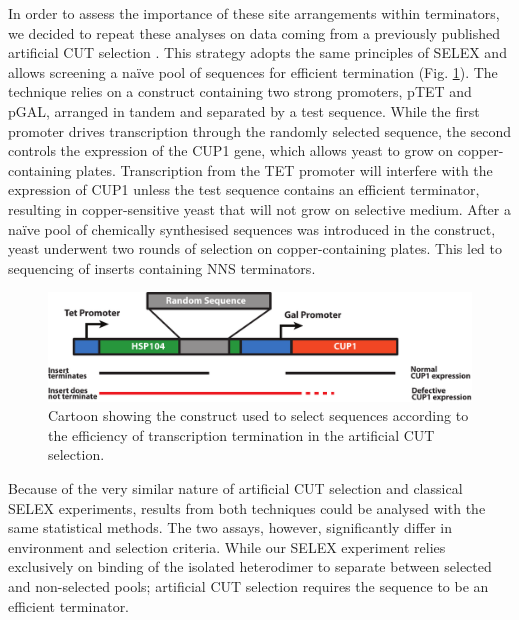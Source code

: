 In order to assess the importance of these site arrangements within \invivo{} terminators, we decided to repeat these analyses on data coming from a previously published \invivo{} artificial CUT selection \cite{porrua:2012:in}. This strategy adopts the same principles of SELEX and allows screening a naïve pool of sequences for efficient termination \invivo{} (Fig. \ref{fig:vivoSelex}). The technique relies on a construct containing two strong promoters, pTET and pGAL, arranged in tandem and separated by a test sequence. While the first promoter drives transcription through the randomly selected sequence, the second controls the expression of the CUP1 gene, which allows yeast to grow on copper-containing plates. Transcription from the TET promoter will interfere with the expression of CUP1 unless the test sequence contains an efficient terminator, resulting in copper-sensitive yeast that will not grow on selective medium. After a naïve pool of chemically synthesised sequences was introduced in the construct, yeast underwent two rounds of selection on copper-containing plates. This led to sequencing of inserts containing NNS terminators. 

\begin{figure}[h]

\centering
\includegraphics[width=\textwidth]{figures/results/vivoSelex}
\caption[Schematic of the selection process in the artificial CUT selection]{Cartoon showing the construct used to select sequences according to the efficiency of transcription termination in the artificial CUT selection. }
\label{fig:vivoSelex}

\end{figure} 

Because of the very similar nature of artificial CUT selection and classical SELEX experiments, results from both techniques could be analysed with the same statistical methods. The two assays, however, significantly differ in environment and selection criteria. While our SELEX experiment relies exclusively on \invitro{} binding of the isolated heterodimer to separate between selected and non-selected pools; artificial CUT selection requires the sequence to be an efficient \invivo{} terminator.  

